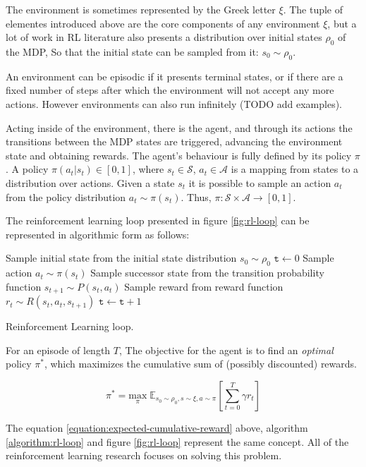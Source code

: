 \documentclass{../main.tex}{subfiles}
\newcommand{\var}{\texttt}
\begin{document}
The environment is sometimes represented by the Greek letter $\xi$. The tuple of elementes introduced above are the core components of any environment $\xi$, but a lot of work in RL literature also presents a distribution over initial states $\rho_0$ of the MDP, So that the initial state can be sampled from it: $s_0 \sim \rho_0$.

An environment can be episodic if it presents terminal states, or if there are a fixed number of steps after which the environment will not accept any more actions. However environments can also run infinitely (TODO add examples).

Acting inside of the environment, there is the agent, and through its actions the transitions between the MDP states are triggered, advancing the environment state and obtaining rewards. The agent's behaviour is fully defined by its policy $\pi$. A policy $\pi(a_t | s_t) \in [0,1]$, where $s_t \in \mathcal{S}$, $a_t \in \mathcal{A}$ is a mapping from states to a distribution over actions. Given a state $s_t$ it is possible to sample an action $a_t$ from the policy distribution $a_t \sim \pi(s_t)$. Thus, $\pi: \mathcal{S} \times \mathcal{A} \to [0,1]$.

The reinforcement learning loop presented in figure \ref{fig:rl-loop} can be represented in algorithmic form as follows:
\begin{algorithm}
Sample initial state from the initial state distribution $s_0 \sim \rho_0$ \;
$\var{t} \leftarrow 0$ \;
 {
    Sample action $a_t \sim \pi(s_t)$\;
    Sample successor state from the transition probability function $ s_{t+1} \sim P(s_t, a_t)$ \;
    Sample reward from reward function $r_t \sim R(s_t, a_t, s_{t+1})$ \;
    $\var{t} \leftarrow \var{t} + 1$ \;
}
\caption{Reinforcement Learning loop.}
\label{algorithm:rl-loop}
\end{algorithm}

For an episode of length $T$, The objective for the agent is to find an \textit{optimal} policy $\pi^*$, which maximizes the cumulative sum of (possibly discounted) rewards.

\begin{equation}
    \pi^{*} = \underset{\pi}{\text{max}}\;  \mathbb{E}_{s_0 \sim \rho_0, s \sim \xi, a \sim \pi}[\sum_{t=0}^{T} \gamma r_t]
    \label{equation:expected-cumulative-reward}
\end{equation}

The equation \ref{equation:expected-cumulative-reward} above, algorithm \ref{algorithm:rl-loop} and figure \ref{fig:rl-loop} represent the same concept. All of the reinforcement learning research focuses on solving this problem.
\end{document}
